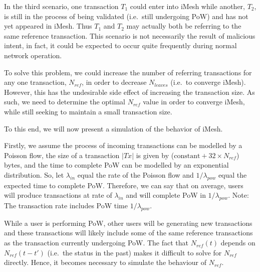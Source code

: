 \documentclass[a4paper,10pt,twocolumn]{article}
\begin{document}
	\vspace{2.5mm}
	
	In the third scenario, one transaction \(T_1\) could enter into iMesh while another, \(T_2\), is still in the process of being validated (i.e.\ still undergoing PoW) and has not yet appeared in iMesh.
	Thus \(T_1\) and \(T_2\) may actually both be referring to the same reference transaction.
	This scenario is not necessarily the result of malicious intent, in fact, it could be expected to occur quite frequently during normal network operation.
	
	\vspace{2.5mm}
	
	To solve this problem, we could increase the number of referring transactions for any one transaction, \( N_{ref} \), in order 
	to decrease \( N _{leaves} \) (i.e.\ to converge iMesh). However, this has the undesirable side effect of increasing the transaction size.
	As such, we need to determine the optimal \( N_{ref} \) value in order to converge iMesh, while still seeking to maintain a small transaction size. 
	
	\vspace{2.5mm}
	
	To this end, we will now present a simulation of the behavior of iMesh.
	
	\vspace{2.5mm}
	
	Firstly, we assume the process of incoming transactions can be modelled by a Poisson flow, the size of a  transaction  \(|Tx|\)  is given by (\( \text{constant} + 32 \times N_{ref}\)) bytes, and the time to complete PoW can be modelled by an exponential distribution.
	So, let \(\lambda_{in}\) equal the rate of the Poisson flow  and \(1 / \lambda_{pow}\) equal the expected time to complete PoW.
	Therefore, we can say that on average, users will produce transactions at rate of \(\lambda_{in}\) and will complete PoW in \(1/\lambda_{pow}\).
	Note: The transaction rate includes PoW time \(1/\lambda_{pow}\).
	
	\vspace{2.5mm}
	
	While a user is performing PoW, other users will be generating new transactions and these transactions will likely include some of the same reference transactions as the transaction currently undergoing PoW.
	The fact that \( N_{ref} (t) \) depends on \( N_{ref} (t-t')\) (i.e.\ the status in the past) makes it difficult 
	to solve for \( N_{ref}\) directly. Hence, it becomes necessary to simulate the behaviour of \( N_{ref}\).
	
\end{document}

